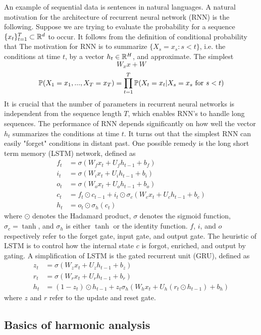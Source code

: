 \documentclass{article}
\begin{document}
An example of sequential data is sentences in natural languages.
A natural motivation for the architecture of recurrent neural network (RNN) is the following.
Suppose we are trying to evaluate the probability for a sequence $\{x_t\}_{t = 1}^T \subset {\mathbb R}^d$ to occur.
It follows from the definition of conditional probability that
The motivation for RNN is to summarize $\{X_s = x_s : s < t\}$, i.e. the conditions at time $t$, by a vector $h_t \in {\mathbb R}^H$, and approximate.
The simplest
\[
W_x x + W
\]
\[
{\mathbb P} (X_1 = x_1, ..., X_T = x_T)
= \prod_{t = 1}^T {\mathbb P} (X_t = x_t | X_s = x_s\ \text{for}\ s < t)
\]
It is crucial that the number of parameters in recurrent neural networks is independent from the sequence length $T$, which enables RNN's to handle long sequences.
The performance of RNN depends significantly on how well the vector $h_t$ summarizes the conditions at time $t$.
It turns out that the simplest RNN can easily "forget" conditions in distant past.
One possible remedy is the long short term memory (LSTM) network, defined as
\begin{align*}
f_t & = \sigma (W_f x_t + U_f h_{t - 1} + b_f) \\
i_t & = \sigma (W_i x_t + U_i h_{t - 1} + b_i) \\
o_t & = \sigma (W_o x_t + U_o h_{t - 1} + b_o) \\
c_t & = f_t \odot c_{t - 1} + i_t \odot \sigma_c (W_c x_t + U_c h_{t - 1} + b_c) \\
h_t & = o_t \odot \sigma_h (c_t)
\end{align*}
where $\odot$ denotes the Hadamard product, $\sigma$ denotes the sigmoid function, $\sigma_c = \tanh$, and $\sigma_h$ is either $\tanh$ or the identity function.
$f$, $i$, and $o$ respectively refer to the forget gate, input gate, and output gate.
The heuristic of LSTM is to control how the internal state $c$ is forgot, enriched, and output by gating.
A simplification of LSTM is the gated recurrent unit (GRU), defined as
\begin{align*}
z_t & = \sigma (W_z x_t + U_z h_{t - 1} + b_z) \\
r_t & = \sigma (W_r x_t + U_r h_{t - 1} + b_r) \\
h_t & = (1 - z_t) \odot h_{t - 1} + z_t \sigma_h (W_h x_t + U_h (r_t \odot h_{t - 1}) + b_h)
\end{align*}
where $z$ and $r$ refer to the update and reset gate.

\subsection{Basics of harmonic analysis}
\end{document}
